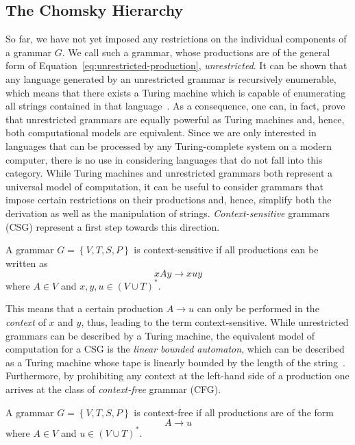 \subsection{The Chomsky Hierarchy}
\label{sec:chomsky-hierarchy}
So far, we have not yet imposed any restrictions on the individual components of a grammar $G$.
We call such a grammar, whose productions are of the general form of Equation~\eqref{eq:unrestricted-production}, \emph{unrestricted}.
It can be shown that any language generated by an unrestricted grammar is recursively enumerable, which means that there exists a Turing machine which is capable of enumerating all strings contained in that language~\cite{linz2006introduction}.
As a consequence, one can, in fact, prove that unrestricted grammars are equally powerful as Turing machines and, hence, both computational models are equivalent.
Since we are only interested in languages that can be processed by any Turing-complete system on a modern computer, there is no use in considering languages that do not fall into this category.
While Turing machines and unrestricted grammars both represent a universal model of computation, it can be useful to consider grammars that impose certain restrictions on their productions and, hence, simplify both the derivation as well as the manipulation of strings.
\emph{Context-sensitive} grammars (CSG) represent a first step towards this direction.
\begin{definition}
A grammar $G = \left\{V, T, S, P\right\}$ is context-sensitive if all productions can be written as
\begin{equation*}
	xAy \to xuy
\end{equation*}
where $A \in V$ and $x, y, u \in \left(V \cup T\right)^*$.
\label{def:context-sensitive-grammar}
\end{definition}
This means that a certain production $A \to u$ can only be performed in the \emph{context} of $x$ and $y$, thus, leading to the term context-sensitive.
While unrestricted grammars can be described by a Turing machine, the equivalent model of computation for a CSG is the \emph{linear bounded automaton}, which can be described as a Turing machine whose tape is linearly bounded by the length of the string~\cite{linz2006introduction}.
Furthermore, by prohibiting any context at the left-hand side of a production one arrives at the class of \emph{context-free} grammar (CFG).
\begin{definition}
	A grammar $G = \left\{V, T, S, P\right\}$ is context-free if all productions are of the form
	\begin{equation*}
		A \to u 
	\end{equation*}
	where $A \in V$ and $u \in \left(V \cup T\right)^*$.
\end{definition}
